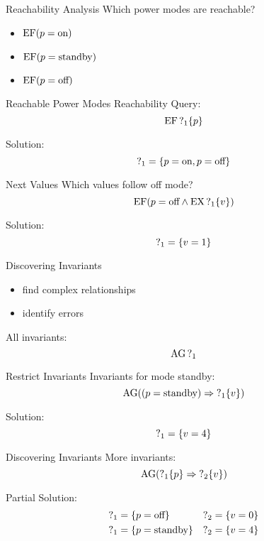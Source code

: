 \begin{frame}{Reachability Analysis}
  Which power modes are reachable?
  \begin{itemize}
    \item $\operatorname{EF} (p = \text{on})$
    \item $\operatorname{EF} (p = \text{standby})$
    \item $\operatorname{EF} (p = \text{off})$
  \end{itemize}
\end{frame}

\begin{frame}{Reachable Power Modes}
  Reachability Query:
  \[\operatorname{EF} \operatorname{?}_1\{p\}\]

  Solution:
  \[ \operatorname{?}_1 = \{p = \text{on}, p = \text{off}\} \]
\end{frame}

\begin{frame}{Next Values}
  Which values follow off mode?
  \[ \operatorname{EF} (p = \text{off} \land \operatorname{EX}\operatorname{?}_1\{v\}) \]

  Solution:
  \[ \operatorname{?}_1 = \{v = 1\} \]
\end{frame}

\begin{frame}{Discovering Invariants}
  \begin{itemize}
    \item find complex relationships
    \item identify errors
  \end{itemize}

  All invariants:
  \[ \operatorname{AG} \operatorname{?}_1 \]
\end{frame}

\begin{frame}{Restrict Invariants}
  Invariants for mode standby:
  \[ \operatorname{AG} ((p = \text{standby}) \Rightarrow \operatorname{?}_1\{v\}) \]

  Solution:
  \[ \operatorname{?}_1 = \{v = 4\} \]
\end{frame}

\begin{frame}{Discovering Invariants}
  More invariants:
  \[ \operatorname{AG} (\operatorname{?}_1\{p\} \Rightarrow \operatorname{?}_2\{v\}) \]
  
  Partial Solution:
  \begin{align*}
    \operatorname{?}_1 &= \{p = \text{off}\} &\operatorname{?}_2 &= \{v = 0\} \\
    \operatorname{?}_1 &= \{p = \text{standby}\} &\operatorname{?}_2 &= \{v = 4\}
  \end{align*}
\end{frame}


